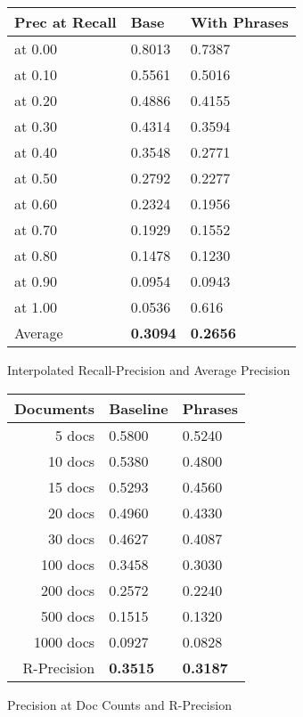\documentclass[11pt,oneside]{article}
\begin{document}
\begin{figure}
\begin{center}
\begin{tabular}{|l|l|l|}
\hline
Prec at Recall & Base & With Phrases 
\\
\hline
    at 0.00       & 0.8013 & 0.7387 \\
    at 0.10       & 0.5561 & 0.5016 \\
    at 0.20       & 0.4886 & 0.4155 \\
    at 0.30       & 0.4314 & 0.3594 \\
    at 0.40       & 0.3548 & 0.2771 \\
    at 0.50       & 0.2792 & 0.2277 \\
    at 0.60       & 0.2324 & 0.1956 \\
    at 0.70       & 0.1929 & 0.1552 \\
    at 0.80       & 0.1478 & 0.1230 \\
    at 0.90       & 0.0954 & 0.0943 \\
    at 1.00       & 0.0536 & 0.616 \\
\hline
    Average       & {\bf 0.3094} & {\bf 0.2656}
\\
\hline
\end{tabular}
\end{center}
\caption{Interpolated Recall-Precision and Average Precision}
\label{results2-fig}
\end{figure}

\begin{figure}
\begin{center}
\begin{tabular}{|r|l|l|}
\hline
Documents & Baseline & Phrases \\
\hline
     5 docs  &   0.5800 & 0.5240 \\
     10 docs &   0.5380 & 0.4800 \\
     15 docs &   0.5293 & 0.4560 \\
     20 docs &   0.4960 & 0.4330 \\
     30 docs &   0.4627 & 0.4087 \\
    100 docs &   0.3458 & 0.3030 \\
    200 docs &   0.2572 & 0.2240 \\
    500 docs &   0.1515 & 0.1320 \\
   1000 docs &   0.0927 & 0.0828 \\
\hline
   R-Precision & {\bf 0.3515} & {\bf 0.3187} \\
\hline
\end{tabular}
\end{center}
\caption{Precision at Doc Counts and R-Precision}
\label{results3-fig}
\end{figure}
\end{document}
